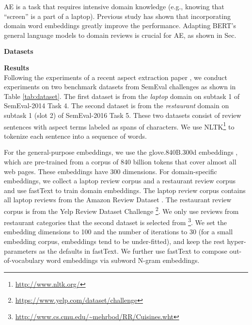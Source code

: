 AE is a task that requires intensive domain knowledge (e.g., knowing that ``screen'' is a part of a laptop). Previous study \cite{xu_acl2018} has shown that incorporating domain word embeddings greatly improve the performance. 
Adapting BERT's general language models to domain reviews is crucial for AE,
as shown in Sec. %


\textbf{Datasets}\\

\begin{table}[H]
    \label{tab:dataset} 
    \centering
    \caption{Dataset for AE}
\end{table}

\textbf{Results}\\
Following the experiments of a recent aspect extraction paper \cite{li2017deep},
we conduct experiments on two benchmark datasets from SemEval challenges \cite{pontiki2014SemEval,pontiki2016semeval} as shown in Table \ref{tab:dataset}. 
The first dataset is from the \textit{laptop} domain on subtask 1 of SemEval-2014 Task 4.
The second dataset is from the \textit{restaurant} domain on subtask 1 (slot 2) of SemEval-2016 Task 5.
These two datasets consist of review sentences with aspect terms labeled as spans of characters.
We use NLTK\footnote{\url{http://www.nltk.org/} } to tokenize each sentence into a sequence of words. 

For the general-purpose embeddings, we use the glove.840B.300d embeddings \cite{pennington2014glove}, which are pre-trained from a corpus of 840 billion tokens that cover almost all web pages. These embeddings have 300 dimensions.
For domain-specific embeddings, we collect a laptop review corpus and a restaurant review corpus and use fastText \cite{bojanowski2016enriching} to train domain embeddings.  
The laptop review corpus contains all laptop reviews from the Amazon Review Dataset \cite{he2016ups}.
The restaurant review corpus is from the Yelp Review Dataset Challenge \footnote{\url{https://www.yelp.com/dataset/challenge} }.
We only use reviews from restaurant categories that the second dataset is selected from \footnote{\url{http://www.cs.cmu.edu/~mehrbod/RR/Cuisines.wht} }.
We set the embedding dimensions to 100 and the number of iterations to 30 (for a small embedding corpus, embeddings tend to be under-fitted), and keep the rest hyper-parameters as the defaults in fastText.
We further use fastText to compose out-of-vocabulary word embeddings via subword N-gram embeddings.

